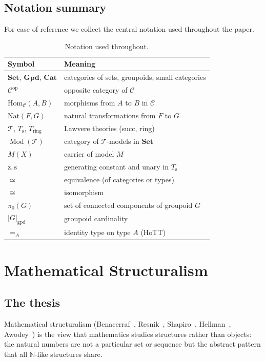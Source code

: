 \documentclass[12pt]{article}
\theoremstyle{definition}
\theoremstyle{remark}
\newcommand{\Set}{\mathbf{Set}}
\newcommand{\Grpd}{\mathbf{Gpd}}
\newcommand{\Cat}{\mathbf{Cat}}
\newcommand{\op}{\mathrm{op}}
\newcommand{\Hom}{\mathrm{Hom}}
\newcommand{\Nat}{\mathrm{Nat}}
\newcommand{\NN}{\mathbb{N}}
\newcommand{\T}{\mathcal{T}}
\newcommand{\C}{\mathcal{C}}
\newcommand{\Mod}[1]{\operatorname{Mod}(#1)}
\newcommand{\eq}{\simeq}
\newcommand{\iso}{\cong}
\newcommand{\succop}{\mathrm{s}}
\newcommand{\zeroop}{\mathrm{z}}
\begin{document}
\subsection{Notation summary}

For ease of reference we collect the central notation used throughout the paper.

\begin{table}[ht]
\centering
\small
\begin{tabular}{ll}
\hline
\textbf{Symbol} & \textbf{Meaning} \\
\hline
$\Set$, $\Grpd$, $\Cat$ & categories of sets, groupoids, small categories \\
$\C^\op$ & opposite category of $\C$ \\
$\Hom_\C(A,B)$ & morphisms from $A$ to $B$ in $\C$ \\
$\Nat(F,G)$ & natural transformations from $F$ to $G$ \\
$\T$, $T_\succop$, $T_{\mathrm{ring}}$ & Lawvere theories (succ, ring) \\
$\Mod{\T}$ & category of $\T$-models in $\Set$ \\
$M(X)$ & carrier of model $M$ \\
$\zeroop, \succop$ & generating constant and unary in $T_\succop$ \\
$\eq$ & equivalence (of categories or types) \\
$\iso$ & isomorphism \\
$\pi_0(G)$ & set of connected components of groupoid $G$ \\
$|G|_{\mathrm{gpd}}$ & groupoid cardinality \\
$=_A$ & identity type on type $A$ (HoTT) \\
\hline
\end{tabular}
\caption{Notation used throughout.}
\label{tab:notation}
\end{table}

\section{Mathematical Structuralism}\label{sec:structuralism}

\subsection{The thesis}

Mathematical structuralism (Benacerraf~\cite{Benacerraf1965}, Resnik~\cite{Resnik1997}, Shapiro~\cite{Shapiro1997}, Hellman~\cite{Hellman1989}, Awodey~\cite{Awodey1996,Awodey2014}) is the view that mathematics studies structures rather than objects: the natural numbers are not a particular set or sequence but the abstract pattern that all $\NN$-like structures share.
\end{document}
